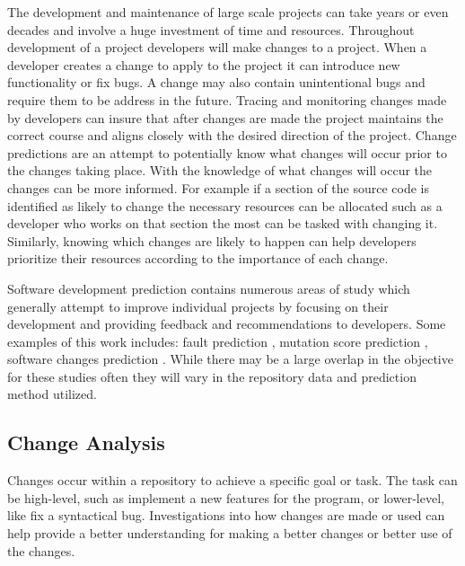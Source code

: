 The development and maintenance of large scale projects can take years or even decades and involve a huge investment of time and resources. Throughout development of a project developers will make changes to a project. When a developer creates a change to apply to the project it can introduce new functionality or fix bugs. A change may also contain unintentional bugs and require them to be address in the future. Tracing and monitoring changes made by developers can insure that after changes are made the project maintains the correct course and aligns closely with the desired direction of the project. Change predictions are an attempt to potentially know what changes will occur prior to the changes taking place. With the knowledge of what changes will occur the changes can be more informed. For example if a section of the source code is identified as likely to change the necessary resources can be allocated such as a developer who works on that section the most can be tasked with changing it. Similarly, knowing which changes are likely to happen can help developers prioritize their resources according to the importance of each change.

Software development prediction contains numerous areas of study which generally attempt to improve individual projects by focusing on their development and providing feedback and recommendations to developers. Some examples of this work includes: fault prediction \cite{Nagappan2007, Moser2008, Thwin2005, Sisman2012}, mutation score prediction \cite{Jalbert2012}, software changes prediction \cite{Bantelay2013, Chaturvedi2014, Giger2012, Hassan2004, Kagdi2007, Ying2004}. While there may be a large overlap in the objective for these studies often they will vary in the repository data and prediction method utilized.

\subsection{Change Analysis}

Changes occur within a repository to achieve a specific goal or task. The task can be high-level, such as implement a new features for the program, or lower-level, like fix a syntactical bug. Investigations into how changes are made or used can help provide a better understanding for making a better changes or better use of the changes.

